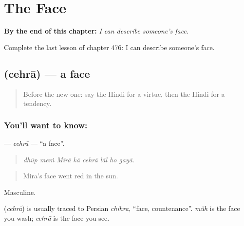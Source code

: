 
\chapter{The Face}
\label{ch:hi-the-face}

\begin{chapteropening}
\textbf{By the end of this chapter:} \emph{I can describe someone's face.}

Complete the last lesson of chapter 476: I can describe someone's face.
\end{chapteropening}

\section[\texorpdfstring{\hi{चेहरा} (cehrā)}{चेहरा (cehrā)}]{ (cehrā) — a face}

\label{lesson:HI-C476-cehra}



\begin{quote}
Before the new one: say the Hindi for a virtue, then the Hindi for a tendency.
\end{quote}

\subsection*{You'll want to know: }
\textbf{} — \emph{cehrā} — \textquotedblleft{}a face\textquotedblright{}.

\begin{quote}
       
\end{quote}

\begin{quote}
\emph{dhūp meṁ Mīrā kā cehrā lāl ho gayā.}
\end{quote}

\begin{quote}
Mira's face went red in the sun.
\end{quote}

Masculine.

\begin{cousinweb}
\textbf{} (\emph{cehrā}) is usually traced to Persian \emph{chihra}, \textquotedblleft{}face, countenance\textquotedblright{}. \emph{mũh} is the face you wash; \emph{cehrā} is the face you see.
\end{cousinweb}


